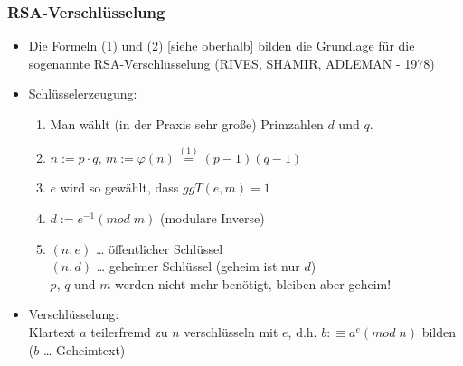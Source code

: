 \subsubsection*{RSA-Verschlüsselung}
\begin{itemize}
\item Die Formeln (1) und (2) [siehe oberhalb] bilden die Grundlage für die sogenannte RSA-Verschlüsselung (RIVES, SHAMIR, ADLEMAN - 1978)
\item Schlüsselerzeugung:
\begin{enumerate}
\item Man wählt (in der Praxis sehr große) Primzahlen $d$ und $q$.
\item $n:= p \cdot q$, $m:= \varphi (n) \overset{(1)}{=} (p-1)(q-1)$
\item $e$ wird so gewählt, dass $ggT(e,m)=1$
\item $d:= e^{-1} (mod \; m)$ (modulare Inverse)
\item $(n,e)$ … öffentlicher Schlüssel\\
$(n,d)$ … geheimer Schlüssel (geheim ist nur $d$)\\
$p$, $q$ und $m$ werden nicht mehr benötigt, bleiben aber geheim!
\end{enumerate}
\item Verschlüsselung: \\
Klartext $a$ teilerfremd zu $n$ verschlüsseln mit $e$, d.h. $b:\equiv a^e (mod \; n)$ bilden ($b$ … Geheimtext)
\end{itemize}







